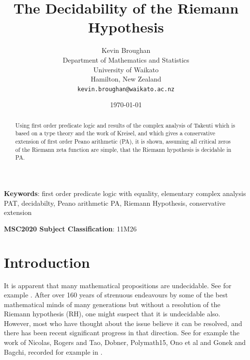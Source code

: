 \documentclass[12pt]{article}
\begin{document}

\title{The Decidability of the Riemann Hypothesis}

\author{
{Kevin Broughan} \\
{ Department of Mathematics and Statistics}\\
{University of Waikato}\\
{Hamilton, New Zealand}\\
{\tt kevin.broughan@waikato.ac.nz} \\
}
\date{\today}



\maketitle


\begin{abstract}
Using first order predicate logic and results of the complex analysis of Takeuti which is based on a type theory and the work of Kreisel, and which gives a conservative extension of first order Peano arithmetic (PA), it is shown, assuming all critical zeros of the Riemann zeta function are simple, that the Riemann hypothesis is decidable in PA. 
\end{abstract}

{\bf Keywords}: first order predicate logic with equality, elementary complex analysis PAT, decidabilty, Peano arithmetic PA, Riemann Hypothesis, conservative extension

{\bf MSC2020 Subject Classification}: 11M26


\section{Introduction}
\label{int}

It is apparent that many mathematical propositions are undecidable. See for example \cite[Chapter 10]{bro}. After over 160 years of strenuous endeavours by some of the best mathematical minds of many generations but without a resolution of the Riemann hypothesis (RH), one might suspect that it is undecidable also. However, most who have thought about the issue believe it can be resolved, and there has been recent significant progress in that direction. See for example the work of Nicolas, Rogers and Tao, Dobner, Polymath15, Ono et al and Gonek and Bagchi, recorded for example in \cite{bro}.\par
\end{document}
